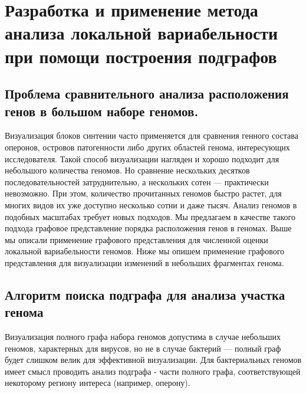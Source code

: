 \section{Разработка и применение метода анализа локальной вариабельности при помощи построения подграфов}
\subsection{Проблема сравнительного анализа расположения генов в большом наборе геномов.}

Визуализация блоков синтении часто применяется для сравнения генного состава оперонов, островов патогенности либо других областей генома, интересующих исследователя. Такой способ визуализации нагляден и хорошо подходит для небольшого количества геномов. Но сравнение нескольких десятков последовательностей затруднительно, а нескольких сотен --- практически невозможно. При этом, количество прочитанных геномов быстро растет, для многих видов их уже доступно несколько сотни и даже тысяч. Анализ геномов в подобных масштабах требует новых подходов. Мы предлагаем в качестве такого подхода графовое представление порядка расположения генов в геномах. Выше мы описали применение графового представления для численной оценки локальной вариабельности геномов. Ниже мы опишем применение графового представления для визуализации изменений в небольших фрагментах генома. 

\subsection{Алгоритм поиска подграфа для анализа участка генома}

Визуализация полного графа набора геномов допустима в случае небольших геномов, характерных для вирусов, но не в случае бактерий --- полный граф будет слишком велик для эффективной визуализации. Для бактериальных геномов имеет смысл проводить анализ подграфа - части полного графа, соответствующей некоторому региону интереса (например, оперону).

